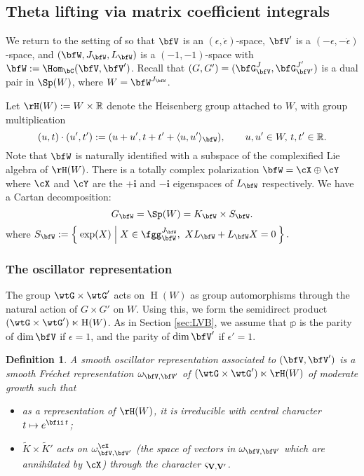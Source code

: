 \documentclass[12pt,a4paper]{amsart}
\newcommand{\oH}{\operatorname{H}}
\newcommand{\R}{\mathbb R}
\newcommand{\la}{\langle}
\newcommand{\ra}{\rangle}
\numberwithin{equation}{section}
\newtheorem{defn}[thm]{Definition}
\theoremstyle{remark}
\def\abfV{\bfV'}
\def\GVr{G}
\def\tGVr{\wtG}
\def\GVar{G'}
\def\tGVar{\wtG'}
\def\mktvvp{\varsigma_{{\bf V},{\bf V}'}}
\begin{document}
\subsection{Theta lifting via matrix coefficient integrals}\label{sec:MCI}
We return to the setting of  so that
$\bfV$ is an $(\epsilon, \dot \epsilon)$-space, $\abfV$ is a
$(-\epsilon, -\dot \epsilon)$-space, and $(\bfW,J_{\bfW},L_{\bfW})$ is a
$(-1,-1)$-space with $\bfW:= \Hom_\bC(\bfV,\abfV)$.
Recall that $(\GVr,\GVar) = (\bfG_{\bfV}^{J},\bfG_{\bfV'}^{J'})$ is a dual pair in $\Sp(W)$, where
$W=\bfW^{J_{\bfW}}$.

Let $\rH(W):=W\times \R$
denote the Heisenberg group attached to $W$, with group multiplication
\[
  (u,t)\cdot (u', t'):=(u+u', t+t'+\la u, u'\ra_{\bfW}), \qquad u,u'\in W, \, t, t'\in \R.
\]
Note that $\bfW$ is naturally
identified with a subspace of the complexified Lie algebra of $\rH(W)$. There is a totally complex
polarization $\bfW = \cX\oplus \cY$ where $\cX$ and $\cY$ are the $+\mathbf i$ and $-\mathbf i$
eigenspaces  of $L_{\bfW}$ respectively.
We have a Cartan decomposition:
\[
   G_{\bfW}=\Sp(W)=K_{\bfW}\times S_{\bfW}.
\]
where
$
 S_{\bfW}:=\Set{\exp(X) | X\in \fgg_{\bfW}^{J_\bfW}, \ X L_{\bfW}+L_{\bfW} X=0}.
$


\subsubsection{The oscillator representation}
The group $\tGVr\times \tGVar$ acts on $\oH(W)$ as group automorphisms through the natural action of $\GVr\times \GVar$ on $W$. Using this, we form the semidirect product $(\tGVr\times \tGVar)\ltimes \oH(W)$.
As in   Section \ref{sec:LVB}, we assume that $\mathbb p$ is the parity of $\dim \bfV$ if $\epsilon=1$, and  the parity of $\dim \bfV'$ if $\epsilon '=1$.
\begin{defn}\label{defor}
A smooth oscillator representation associated to $(\bfV,\abfV)$ is a smooth Fr\'echet representation $\omega_{\bfV,\abfV}$ of $(\tGVr\times \tGVar)\ltimes \rH(W)$ of moderate growth such  that
\begin{itemize}
\item as a representation of $\rH(W)$, it is irreducible with central character
  $t\mapsto e^{\bfii\, t}$;
\item $\widetilde K\times \widetilde K'$ acts on  $\omega_{\bfV,\abfV}^{\cX}$ (the space of vectors in
  $\omega_{\bfV,\abfV}$ which are annihilated by $\cX$) through the character $\mktvvp$.
\end{itemize}
\end{defn}
\end{document}
